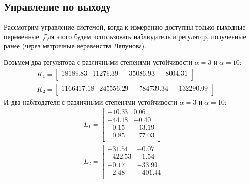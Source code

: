 \subsection{Управление по выходу}
Рассмотрим управление системой, когда к измерению доступны только выходные переменные. Для этого будем использовать
наблюдатель и регулятор, полученные ранее (через матричные неравенства Ляпунова).

Возьмем два регулятора с различными степенями устойчивости $\alpha = 3$ и $\alpha = 10$: 
\begin{equation}
    \begin{array}{cc}
        K_1 = \begin{bmatrix}
        18189.83  & 11279.39  & -35086.93  & -8004.31 \\ 
        \end{bmatrix}  \\ 
        K_2 = \begin{bmatrix}
        1166417.18  & 245556.29  & -784739.34  & -132290.09 \\ 
        \end{bmatrix}
    \end{array}
\end{equation}
И два наблюдателя с различными степенями устойчивости $\alpha = 3$ и $\alpha = 10$:
\begin{equation}
    \begin{array}{cc}
        L_1 = \begin{bmatrix}
        -10.33  & 0.06 \\ 
        -44.18  & -0.40 \\ 
        -0.15  & -13.19 \\ 
        -0.85  & -77.03 \\ 
        \end{bmatrix} \\[3em]
        L_2 = \begin{bmatrix}
        -31.54  & -0.07 \\ 
        -422.53  & -1.54 \\ 
        -0.17  & -33.90 \\ 
        -2.48  & -401.44 \\ 
        \end{bmatrix}
    \end{array}
\end{equation}

